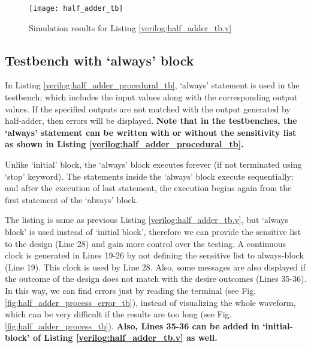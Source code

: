 

\begin{figure}[!h]
	\centering
	\texttt{[image: half\_adder\_tb]}
	\caption{Simulation results for Listing \ref{verilog:half_adder_tb.v}}
	\label{fig:half_adder_tb}
\end{figure}
%
%
\subsection{Testbench with `always' block} \label{sec:tb_with_process_statement}
In Listing \ref{verilog:half_adder_procedural_tb}, `always' statement is used in the testbench; which includes the input values along with the corresponding output values.  If the specified outputs are not matched with the output generated by half-adder, then errors will be displayed. \textbf{Note that in the testbenches, the `always' statement can be written with or without the sensitivity list as shown in Listing \ref{verilog:half_adder_procedural_tb}.}
\begin{noNumBox}
	Unlike `initial' block, the `always' block executes forever (if not terminated using `stop' keyword). The statements inside the `always' block execute sequentially; and after the execution of last statement, the execution begins again from the first statement of the `always' block. 
\end{noNumBox}
%
\begin{explanation}
	The listing is same as previous Listing \ref{verilog:half_adder_tb.v}, but `always block' is used instead of `initial block', therefore we can provide the sensitive list to the design (Line 28) and gain more control over the testing. A continuous clock is generated in Lines 19-26 by not defining the sensitive list to always-block (Line 19). This clock is used by Line 28. Also, some messages are also displayed if the outcome of the design does not match with the desire outcomes (Lines 35-36). In this way, we can find errors just by reading the terminal (see Fig. \ref{fig:half_adder_process_error_tb}), instead of visualizing the whole waveform, which can be very difficult if the results are too long (see Fig. \ref{fig:half_adder_process_tb}). \textbf{Also, Lines 35-36 can be added in `initial-block' of Listing \ref{verilog:half_adder_tb.v} as well.}
\end{explanation}

